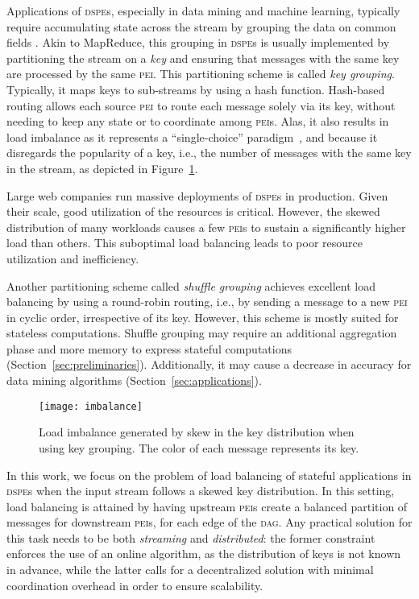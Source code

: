 \documentclass[10pt,conference,letterpaper]{IEEEtran}
\newcommand{\pei}{\textsc{pei}\xspace}
\newcommand{\peis}{{\pei}s\xspace}
\newcommand{\dspe}{\textsc{dspe}\xspace}
\newcommand{\dspes}{{\dspe}s\xspace}
\newcommand{\dagr}{\textsc{dag}\xspace}
\begin{document}
Applications of \dspes, especially in data mining and machine learning, typically require accumulating state across the stream by grouping the data on common fields \cite{ben-haim2010spdt,berinde2010heavyhitters}.
Akin to MapReduce, this grouping in \dspes is usually implemented by partitioning the stream on a \emph{key} and ensuring that messages with the same key are processed by the same \pei.
This partitioning scheme is called \emph{key grouping}.
Typically, it maps keys to sub-streams by using a hash function.
Hash-based routing allows each source \pei to route each message solely via its key,  without needing to keep any state or to coordinate among \peis.
Alas, it also results in load imbalance as it represents a ``single-choice'' paradigm~\citep{one_choice_load}, and because it disregards the popularity of a key, i.e., the number of messages with the same key in the stream, as depicted in Figure~\ref{fig:imbalance}.

Large web companies run massive deployments of \dspes in production.
Given their scale, good utilization of the resources is critical.
However, the skewed distribution of many workloads causes a few \peis to sustain a significantly higher load than others. This suboptimal load balancing leads to poor resource utilization and inefficiency.



Another partitioning scheme called \emph{shuffle grouping} achieves excellent load balancing by using a round-robin routing, i.e., by sending a message to a new \pei in cyclic order, irrespective of its key.
However, this scheme is mostly suited for stateless computations.
Shuffle grouping may require an additional aggregation phase and more memory to express stateful computations (Section~\ref{sec:preliminaries}).
Additionally, it may cause a decrease in accuracy for data mining algorithms (Section~\ref{sec:applications}).


\begin{figure}[t]
\begin{center}
\texttt{[image: imbalance]}
\caption{Load imbalance generated by skew in the key distribution when using key grouping. The color of each message represents its key.}
\label{fig:imbalance}
\end{center}
\end{figure}



In this work, we focus on the problem of load balancing of stateful applications in \dspes when the input stream follows a skewed key distribution.
In this setting, load balancing is attained by having upstream \peis create a balanced partition of messages for  downstream \peis, for each edge of the \dagr.
Any practical solution for this task needs to be both \emph{streaming} and \emph{distributed}: the former constraint enforces the use of an online algorithm, as the distribution of keys is not known in advance, while the latter calls for a decentralized solution with minimal coordination overhead in order to ensure scalability.
\end{document}
